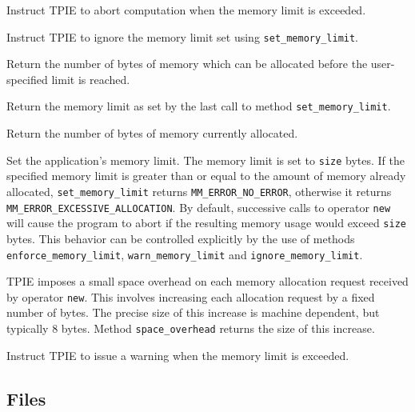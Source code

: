      {Instruct TPIE to
    abort computation when the memory limit is exceeded.}

     {Instruct TPIE to
    ignore the memory limit set using \lstinline|set_memory_limit|.}

     {Return the number of
    bytes of memory which can be allocated before the user-specified limit
    is reached.}

  \etabb
  
  \btabb
     {Return the memory limit as
    set by the last call to method \lstinline|set_memory_limit|.}

     {Return the number of bytes
    of memory currently allocated.}

     {Set the
    application's memory limit. The memory limit is set to \lstinline|size|
    bytes. If the specified memory limit is greater than or equal to the
    amount of memory already allocated, \lstinline|set_memory_limit| returns
    \lstinline|MM_ERROR_NO_ERROR|, otherwise it returns
    \lstinline|MM_ERROR_EXCESSIVE_ALLOCATION|. By default, successive calls
    to operator \lstinline|new| will cause the program to abort if the
    resulting memory usage would exceed \lstinline|size| bytes. This behavior
    can be controlled explicitly by the use of methods
    \lstinline|enforce_memory_limit|, \lstinline|warn_memory_limit| and
    \lstinline|ignore_memory_limit|.}

     {TPIE imposes a small space
    overhead on each memory allocation request received by operator
    \lstinline|new|. This involves increasing each allocation request by a
    fixed number of bytes. The precise size of this increase is machine
    dependent, but typically 8 bytes. Method \lstinline|space_overhead|
    returns the size of this increase.}

     {Instruct TPIE to
    issue a warning when the memory limit is exceeded.}

  \etabb
{}



\subsection{Files}
  \btabb
     {}
  \etabb

